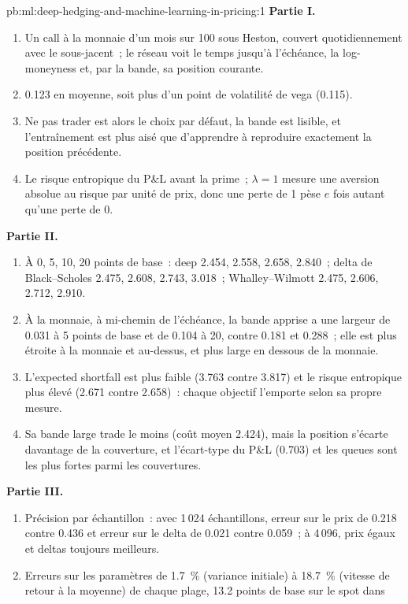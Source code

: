 \begin{solution}{pb:ml:deep-hedging-and-machine-learning-in-pricing:1}
\textbf{Partie I.}
\begin{enumerate}
\item Un call à la monnaie d'un mois sur 100 sous Heston, couvert quotidiennement avec le sous-jacent~; le réseau voit le temps jusqu'à
l'échéance, la log-moneyness et, par la bande, sa position courante.
\item 0.123 en moyenne, soit plus d'un point de volatilité de vega (0.115).
\item Ne pas trader est alors le choix par défaut, la bande est lisible, et l'entraînement est plus aisé que d'apprendre à reproduire
exactement la position précédente.
\item Le risque entropique du P\&L avant la prime~; $\lambda = 1$ mesure une aversion absolue au risque par unité de prix, donc une
perte de 1 pèse $e$ fois autant qu'une perte de 0.
\end{enumerate}
\textbf{Partie II.}
\begin{enumerate}[resume]
\item À 0, 5, 10, 20 points de base~: deep 2.454, 2.558, 2.658, 2.840~; delta de Black--Scholes 2.475, 2.608, 2.743, 3.018~;
Whalley--Wilmott 2.475, 2.606, 2.712, 2.910.
\item À la monnaie, à mi-chemin de l'échéance, la bande apprise a une largeur de 0.031 à 5 points de base et de 0.104 à 20, contre 0.181 et
0.288~; elle est plus étroite à la monnaie et au-dessus, et plus large en dessous de la monnaie.
\item L'expected shortfall est plus faible (3.763 contre 3.817) et le risque entropique plus élevé (2.671 contre 2.658)~: chaque objectif l'emporte selon
sa propre mesure.
\item Sa bande large trade le moins (coût moyen 2.424), mais la position s'écarte davantage de la couverture, et l'écart-type
du P\&L (0.703) et les queues sont les plus fortes parmi les couvertures.
\end{enumerate}
\textbf{Partie III.}
\begin{enumerate}[resume]
\item Précision par échantillon~: avec 1\,024 échantillons, erreur sur le prix de 0.218 contre 0.436 et erreur sur le delta de 0.021 contre 0.059~; à 4\,096,
prix égaux et deltas toujours meilleurs.
\item Erreurs sur les paramètres de 1.7~\% (variance initiale) à 18.7~\% (vitesse de retour à la moyenne) de chaque plage, 13.2 points de base sur le spot dans

\end{enumerate}
\end{solution}
